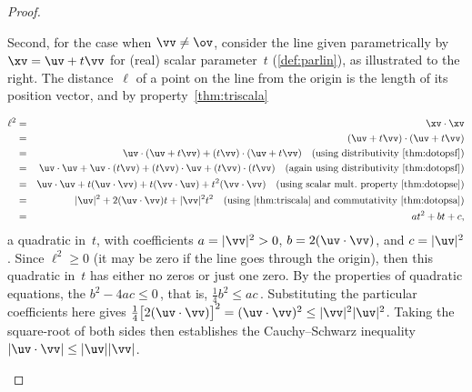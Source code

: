 \begin{proof}
\begin{description}
\begin{figbox}{}%
Second, for the case when \(\vv\neq\ov\), consider the line given parametrically by \(\xv=\uv+t\vv\) for (real) scalar parameter~\(t\) (\cref{def:parlin}), as illustrated to the right.
The distance~\(\ell\) of a point on the line from the origin is the length of its position vector, and by property~\ref{thm:triscala}
\end{figbox}
\begin{eqnarray*}
\ell^2&=&\xv\cdot\xv
\\&=&(\uv+t\vv)\cdot(\uv+t\vv)
\\&=&\uv\cdot(\uv+t\vv)+(t\vv)\cdot(\uv+t\vv)
\quad(\text{using distributivity~\ref{thm:dotopsf}})
\\&=&\uv\cdot\uv+\uv\cdot(t\vv)+(t\vv)\cdot\uv+(t\vv)\cdot(t\vv)
\quad(\text{again using distributivity~\ref{thm:dotopsf}})
\\&=&\uv\cdot\uv+t(\uv\cdot\vv)+t(\vv\cdot\uv)+t^2(\vv\cdot\vv)
\quad(\text{using scalar mult.\ property~\ref{thm:dotopse}})
\\&=&|\uv|^2+2(\uv\cdot\vv)t+|\vv|^2t^2
\quad(\text{using~\ref{thm:triscala} and commutativity~\ref{thm:dotopsa}})
\\&=&at^2+bt+c,
\end{eqnarray*}
a quadratic in~\(t\), with coefficients \(a=|\vv|^2>0\), \(b=2(\uv\cdot\vv)\), and \(c=|\uv|^2\).
Since \(\ell^2\geq0\) (it may be zero if the line goes through the origin), then this quadratic in~\(t\) has either no zeros or just one zero.
By the properties of quadratic equations, the  \(b^2-4ac\leq0\)\,, that is, \(\tfrac14b^2\leq ac\)\,.
Substituting the particular coefficients here gives 
\(\tfrac14\big[2(\uv\cdot\vv)\big]^2=(\uv\cdot\vv)^2\leq|\vv|^2|\uv|^2\).
Taking the square-root of both sides then establishes the Cauchy--Schwarz inequality  \(|\uv\cdot\vv|\leq|\uv||\vv|\).


\end{description}
\end{proof}
